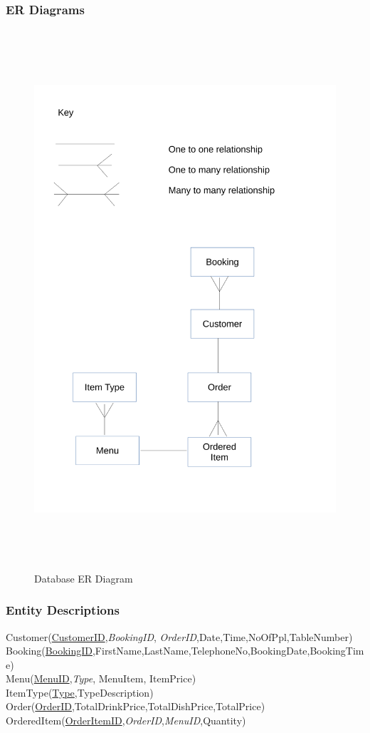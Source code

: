 \subsubsection{ER Diagrams}

\begin{figure}[H]
    \includegraphics[height = 20cm]{./Design/Images/ERDiagram}
    \caption{Database ER Diagram} \label{fig:2ERDiagram}
\end{figure}
 

\subsubsection{Entity Descriptions}

Customer(\underline{CustomerID},\textit{BookingID}, \textit{OrderID},Date,Time,NoOfPpl,TableNumber) \\
Booking(\underline{BookingID},FirstName,LastName,TelephoneNo,BookingDate,BookingTime) \\
Menu(\underline{MenuID},\textit{Type}, MenuItem, ItemPrice) \\
ItemType(\underline{Type},TypeDescription) \\
Order(\underline{OrderID},TotalDrinkPrice,TotalDishPrice,TotalPrice) \\
OrderedItem(\underline{OrderItemID},\textit{OrderID},\textit{MenuID},Quantity) \\

